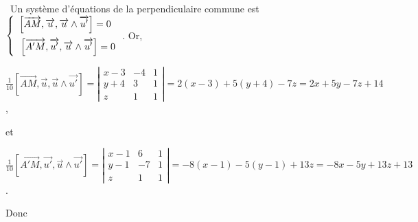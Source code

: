 {{\textbullet~Un système d'équations de la perpendiculaire commune est 
$\left\{
\begin{array}{l}
\left[\overrightarrow{AM},\overrightarrow{u},\overrightarrow{u}\wedge\overrightarrow{u'}\right]=0\\
\rule{0mm}{6mm}\left[\overrightarrow{A'M},\overrightarrow{u'},\overrightarrow{u}\wedge\overrightarrow{u'}\right]=0
\end{array}
\right.$. Or,

\begin{center}
$\frac{1}{10}\left[\overrightarrow{AM},\overrightarrow{u},\overrightarrow{u}\wedge\overrightarrow{u'}\right]=\left|
\begin{array}{ccc}
x-3&-4&1\\
y+4&3&1\\
z&1&1
\end{array}
\right|=2(x-3)+5(y+4)-7z=2x+5y-7z+14$,
\end{center}
et

\begin{center}
$\frac{1}{10}\left[\overrightarrow{A'M},\overrightarrow{u'},\overrightarrow{u}\wedge\overrightarrow{u'}\right]=\left|
\begin{array}{ccc}
x-1&6&1\\
y-1&-7&1\\
z&1&1
\end{array}
\right|=-8(x-1)-5(y-1)+13z=-8x-5y+13z+13$.
\end{center}
Donc

\begin{center}
\end{center}}
}